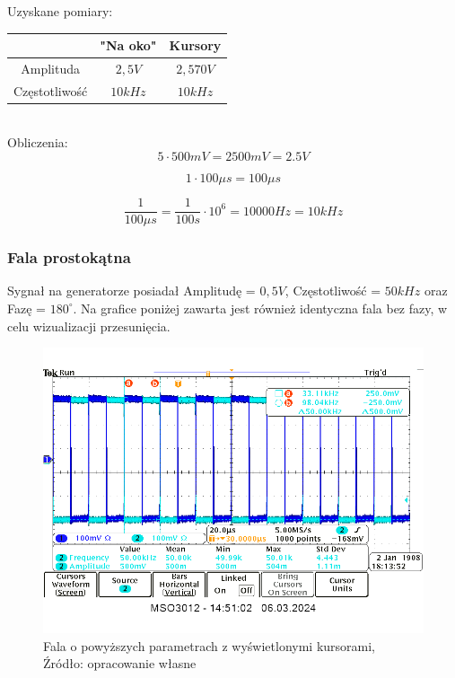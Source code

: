 \documentclass{article}
\begin{document}
        Uzyskane pomiary:\\

        \begin{tabular}{|c|c|c|}
          \hline
          & "{}Na oko"{} & Kursory \\
          \hline
          Amplituda & $2,5V$ & $2,570V$ \\
          \hline
          Częstotliwość & $10kHz$ & $10kHz$ \\
          \hline
        \end{tabular} \\

        Obliczenia:
        \begin{equation}
          5 \cdot 500mV = 2500 mV = 2.5V
        \end{equation}

        \begin{equation}
          1 \cdot 100\mu s = 100 \mu s
        \end{equation}

        \begin{equation}
          \frac{1}{100 \mu s} = \frac{1}{100s} \cdot 10^6 = 10 000 Hz = 10 kHz
        \end{equation}

      \subsubsection{Fala prostokątna}
        Sygnał na generatorze posiadał Amplitudę = $0,5V$, Częstotliwość = $50 kHz$ oraz Fazę = $180^\circ$. Na grafice poniżej zawarta jest również identyczna fala bez fazy, w celu wizualizacji przesunięcia.

        \begin{figure}[!ht]
          \begin{center}
              \includegraphics[scale=0.4]{grafiki/prost_ver.png}
              \caption{Fala o powyższych parametrach z wyświetlonymi kursorami,\\Źródło: opracowanie własne}
          \end{center}
        \end{figure}
\end{document}
